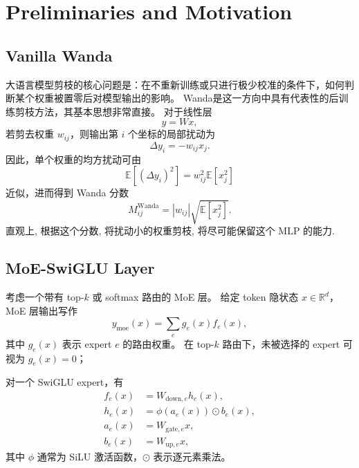 \documentclass[letterpaper]{article}
\begin{document}
\section{Preliminaries and Motivation}

\subsection{Vanilla Wanda}

大语言模型剪枝的核心问题是：在不重新训练或只进行极少校准的条件下，如何判断某个权重被置零后对模型输出的影响。
Wanda\cite{sun2023wanda}是这一方向中具有代表性的后训练剪枝方法，其基本思想非常直接。
对于线性层
\begin{equation}
    y = Wx,
\end{equation}
若剪去权重 $w_{ij}$，则输出第 $i$ 个坐标的局部扰动为
\begin{equation}
    \Delta y_i = -w_{ij}x_j.
\end{equation}
因此，单个权重的均方扰动可由
\begin{equation}
    \mathbb{E}[(\Delta y_i)^2]
    =
    w_{ij}^2 \mathbb{E}[x_j^2]
\end{equation}
近似，进而得到 Wanda 分数
\begin{equation}
    M_{ij}^{\mathrm{Wanda}}
    =
    |w_{ij}|\sqrt{\mathbb{E}[x_j^2]}.
\end{equation}
直观上, 根据这个分数, 将扰动小的权重剪枝, 将尽可能保留这个 $ \text{MLP} $ 的能力.


\subsection{MoE-SwiGLU Layer}

考虑一个带有 top-$k$ 或 softmax 路由的 MoE 层。
给定 token 隐状态 $x \in \mathbb{R}^{d}$，MoE 层输出写作
\begin{equation}\label{eq:moe_output}
    y_{\mathrm{moe}}(x)
    =
    \sum_{e} g_e(x) f_e(x),
\end{equation}
其中 $g_e(x)$ 表示 expert $e$ 的路由权重。
在 top-$k$ 路由下，未被选择的 expert 可视为 $g_e(x)=0$；

对一个 SwiGLU expert，有
\begin{align}
    f_e(x) &= W_{\mathrm{down},e} h_e(x), \\
    h_e(x) &= \phi(a_e(x)) \odot b_e(x), \\
    a_e(x) &= W_{\mathrm{gate},e}x, \\
    b_e(x) &= W_{\mathrm{up},e}x,
\end{align}
其中 $\phi$ 通常为 SiLU 激活函数，$\odot$ 表示逐元素乘法。
\end{document}

